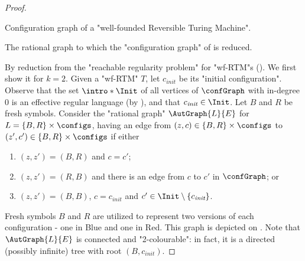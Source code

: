 \begin{proof}%
    \begin{marginfigure}%
        \centering
        \begin{tikzpicture}
            
        \end{tikzpicture}
        \caption{
            \AP\label{fig:reduction-wf-RTM-to-colouring-config-graph-wf-RTM}
            Configuration graph of a "well-founded Reversible Turing Machine".
        }
    \end{marginfigure}%
    \begin{marginfigure}
        \centering
        \begin{tikzpicture}
            
        \end{tikzpicture}
        \caption{
            \AP\label{subfig:reduction-wf-RTM-to-colouring}
            The rational graph to which the "configuration graph"
            of  is reduced.
        }
    \end{marginfigure}%
    By reduction from the "reachable regularity problem" for "wf-RTM"s
    (). We first show it for $k=2$.
    \AP Given a "wf-RTM" $T$, let $c_{\textit{init}}$ be its "initial configuration".
    Observe that the set $\intro*\Init$ of all vertices of $\confGraph$ with in-degree $0$ is an effective regular language (by ), and that $c_{\textit{init}} \in \Init$. Let $B$ and $R$ be fresh symbols. 
    Consider the "rational graph" $\AutGraph{L}{E}$ for $L = \set{B,R} \times \configs$, having 
    an edge from $(z,c) \in \{B,R\} \times \configs$ to $(z',c') \in \{B,R\} \times \configs$ if either 
    \begin{enumerate}
        \item $(z,z') = (B,R)$ and $c=c'$;
        \item $(z,z') = (R,B)$ and there is an edge from $c$ to $c'$ in $\confGraph$; or
        \item $(z,z') = (B,B)$, $c = c_{\textit{init}}$ and $c' \in \Init \setminus \set{c_{\textit{init}}}$.
    \end{enumerate}
Fresh symbols $B$ and $R$ are utilized to represent two versions of each configuration - one in Blue and one in Red. This graph is depicted
    on .
    Note that $\AutGraph{L}{E}$ is connected and "2-colourable": in fact, it is a directed (possibly infinite) tree with root $(B,c_{\textit{init}})$. 
    

\end{proof}
